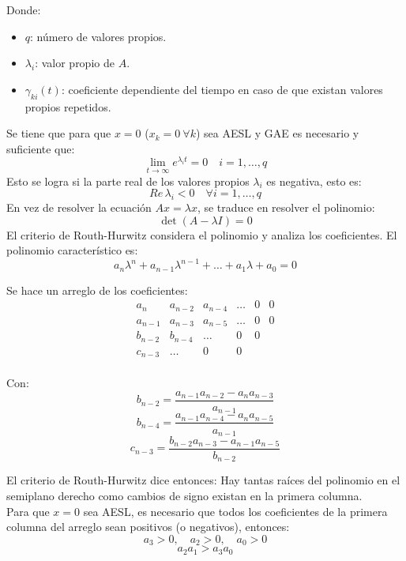 \documentclass[
  11pt,
  letterpaper,
   addpoints,
   answers
  ]{exam}
\begin{document}
    Donde:
    \begin{itemize}
        \item \(q\): número de valores propios.
        \item \(\lambda_i\): valor propio de \(A\).
        \item \(\gamma_{ki}(t)\): coeficiente dependiente del tiempo en caso de que existan valores propios repetidos.
    \end{itemize}
    Se tiene que para que \(x = 0\) (\(x_k = 0 \ \forall k\)) sea AESL y GAE es necesario y suficiente que:
    \[
    \lim_{t \to \infty} e^{\lambda_i t} = 0 \quad i = 1,\ldots, q
    \]
    Esto se logra si la parte real de los valores propios \(\lambda_i\) es negativa, esto es:
    \[
    Re \, \lambda_i < 0 \quad \forall i = 1,\ldots, q
    \]
    En vez de resolver la ecuación \(A x = \lambda x\), se traduce en resolver el polinomio:
    \[
    \det(A - \lambda I) = 0
    \]
    El criterio de Routh-Hurwitz considera el polinomio y analiza los coeficientes. El polinomio característico es:
    \[
    a_n \lambda^n + a_{n-1} \lambda^{n-1} + \dots + a_1 \lambda + a_0 = 0
    \]
    
    Se hace un arreglo de los coeficientes:
    \[
    \begin{array}{cccccc}
    a_n & a_{n-2} & a_{n-4} & \dots & 0 & 0 \\
    a_{n-1} & a_{n-3} & a_{n-5} & \dots & 0 & 0 \\
    b_{n-2} & b_{n-4} & \dots & 0 & 0 \\
    c_{n-3} & \dots & 0 & 0 \\
    \end{array}
    \]
    
    Con:
    \[
    b_{n-2} = \frac{a_{n-1}a_{n-2} - a_n a_{n-3}}{a_{n-1}}
    \]
    \[
    b_{n-4} = \frac{a_{n-1}a_{n-4} - a_n a_{n-5}}{a_{n-1}}
    \]
    \[
    c_{n-3} = \frac{b_{n-2} a_{n-3} - a_{n-1} a_{n-5}}{b_{n-2}}
    \]
    
    El criterio de Routh-Hurwitz dice entonces: Hay tantas raíces del polinomio en el semiplano derecho como cambios de signo existan en la primera columna.\\
    
    Para que \(x = 0\) sea AESL, es necesario que todos los coeficientes de la primera columna del arreglo sean positivos (o negativos), entonces:
    \[
    a_3 > 0, \quad a_2 > 0, \quad a_0 > 0
    \]
    \[
    a_2 a_1 > a_3 a_0
    \]
\end{document}
